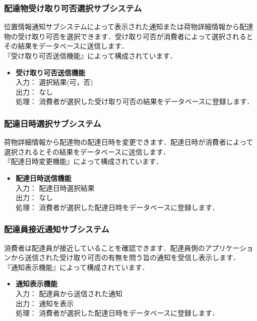 \documentclass[a4j,titlepage]{jarticle}
\begin{document}
\subsubsection{配達物受け取り可否選択サブシステム}
位置情報通知サブシステムによって表示された通知または荷物詳細情報から配達物の受け取り可否を選択できます．受け取り可否が消費者によって選択されるとその結果をデータベースに送信します．\\
『受け取り可否送信機能』によって構成されています．
\begin{itemize}
\item \textbf{受け取り可否送信機能} \\
入力： 選択結果(可，否) \\
出力： なし \\
処理： 消費者が選択した受け取り可否の結果をデータベースに登録します．
\end{itemize}

\subsubsection{配達日時選択サブシステム}
荷物詳細情報から配達物の配達日時を変更できます．配達日時が消費者によって選択されるとその結果をデータベースに送信します．\\
『配達日時変更機能』によって構成されています．
\begin{itemize}
\item \textbf{配達日時送信機能} \\
入力： 配達日時選択結果\\
出力： なし \\
処理： 消費者が選択した配達日時をデータベースに登録します．
\end{itemize}

\subsubsection{配達員接近通知サブシステム}
消費者は配達員が接近していることを確認できます．配達員側のアプリケーションから送信された受け取り可否の有無を問う旨の通知を受信し表示します．\\ 
『通知表示機能』によって構成されています．
\begin{itemize}
\item \textbf{通知表示機能} \\
入力： 配達員から送信された通知 \\
出力： 通知を表示 \\
処理： 消費者が選択した配達日時をデータベースに登録します．
\end{itemize}
\end{document}

